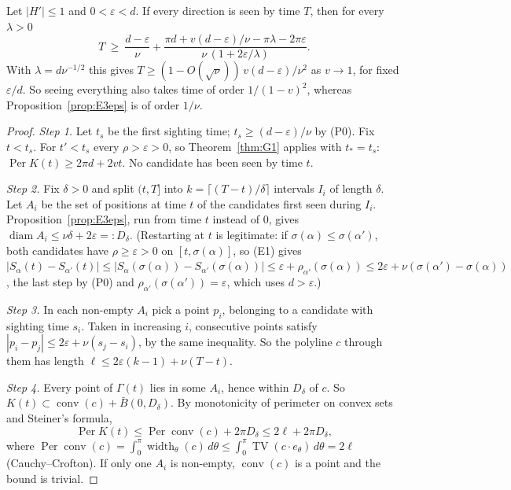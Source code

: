 \begin{corollary}\label{cor:G2p}
Let $|H'|\le1$ and $0<\varepsilon<d$. If every direction is seen by time $T$, then for every $\lambda>0$
\[
T\ \ge\ \frac{d-\varepsilon}{\nu}+\frac{\pi d+v(d-\varepsilon)/\nu-\pi\lambda-2\pi\varepsilon}{\nu\,(1+2\varepsilon/\lambda)} .
\]
With $\lambda=d\nu^{-1/2}$ this gives $T\ge(1-O(\sqrt\nu))\,v(d-\varepsilon)/\nu^2$ as $v\to1$, for fixed $\varepsilon/d$. So seeing everything
also takes time of order $1/(1-v)^2$, whereas Proposition~\ref{prop:E3eps} is of order $1/\nu$.
\end{corollary}
\begin{proof}
\emph{Step 1.} Let $t_s$ be the first sighting time; $t_s\ge(d-\varepsilon)/\nu$ by (P0). Fix $t<t_s$. For $t'<t_s$ every $\rho>\varepsilon>0$, so
Theorem~\ref{thm:G1} applies with $t_*=t_s$: $\operatorname{Per}K(t)\ge2\pi d+2vt$. No candidate has been seen by time $t$.

\emph{Step 2.} Fix $\delta>0$ and split $(t,T]$ into $k=\lceil(T-t)/\delta\rceil$ intervals $I_i$ of length $\delta$. Let $A_i$ be the set
of positions at time $t$ of the candidates first seen during $I_i$. Proposition~\ref{prop:E3eps}, run from time $t$ instead of $0$,
gives $\operatorname{diam}A_i\le\nu\delta+2\varepsilon=:D_\delta$. (Restarting at $t$ is legitimate: if $\sigma(\alpha)\le\sigma(\alpha')$, both
candidates have $\rho\ge\varepsilon>0$ on $[t,\sigma(\alpha)]$, so (E1) gives $|S_\alpha(t)-S_{\alpha'}(t)|\le|S_\alpha(\sigma(\alpha))-S_{\alpha'}(\sigma(\alpha))|
\le\varepsilon+\rho_{\alpha'}(\sigma(\alpha))\le2\varepsilon+\nu(\sigma(\alpha')-\sigma(\alpha))$, the last step by (P0) and $\rho_{\alpha'}(\sigma(\alpha'))=\varepsilon$,
which uses $d>\varepsilon$.)

\emph{Step 3.} In each non-empty $A_i$ pick a point $p_i$, belonging to a candidate with sighting time $s_i$. Taken in increasing
$i$, consecutive points satisfy $|p_i-p_j|\le2\varepsilon+\nu(s_j-s_i)$, by the same inequality. So the polyline $c$ through them has
length $\ell\le2\varepsilon(k-1)+\nu(T-t)$.

\emph{Step 4.} Every point of $\Gamma(t)$ lies in some $A_i$, hence within $D_\delta$ of $c$. So $K(t)\subset\operatorname{conv}(c)+\bar B(0,D_\delta)$.
By monotonicity of perimeter on convex sets and Steiner's formula,
\[
\operatorname{Per}K(t)\le\operatorname{Per}\operatorname{conv}(c)+2\pi D_\delta\le2\ell+2\pi D_\delta ,
\]
where $\operatorname{Per}\operatorname{conv}(c)=\int_0^\pi\operatorname{width}_\theta(c)\,d\theta\le\int_0^\pi\operatorname{TV}(c\cdot e_\theta)\,d\theta=2\ell$
(Cauchy--Crofton). If only one $A_i$ is non-empty, $\operatorname{conv}(c)$ is a point and the bound is trivial.


\end{proof}

